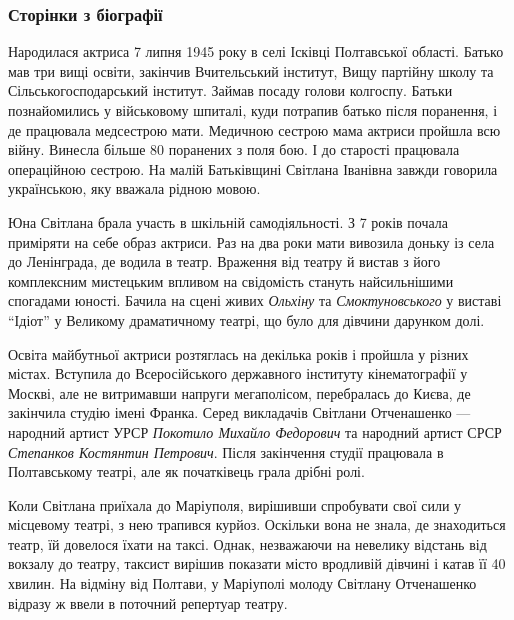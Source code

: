 \subsubsection{Сторінки з біографії}

Народилася актриса 7 липня 1945 року в селі Ісківці Полтавської області. Батько
мав три вищі освіти, закінчив Вчительський інститут, Вищу партійну школу та
Сільськогосподарський інститут. Займав посаду голови колгоспу. Батьки
познайомились у військовому шпиталі, куди потрапив батько після поранення, і де
працювала медсестрою мати. Медичною сестрою мама актриси пройшла всю війну.
Винесла більше 80 поранених з поля бою. І до старості працювала операційною
сестрою. На малій Батьківщині Світлана Іванівна завжди говорила українською,
яку вважала рідною мовою.


Юна Світлана брала участь в шкільній самодіяльності. З 7 років почала приміряти
на себе образ актриси. Раз на два роки мати вивозила доньку із села до
Ленінграда, де водила в театр. Враження від театру й вистав з його комплексним
мистецьким впливом на свідомість стануть найсильнішими спогадами юності. Бачила
на сцені живих \emph{Ольхіну} та \emph{Смоктуновського} у виставі \enquote{Ідіот} у Великому
драматичному театрі, що було для дівчини дарунком долі.

Освіта майбутньої актриси розтяглась на декілька років і пройшла у різних
містах. Вступила до Всеросійського державного інституту кінематографії у
Москві, але не витримавши напруги мегаполісом, перебралась до Києва, де
закінчила студію імені Франка. Серед викладачів Світлани Отченашенко — народний
артист УРСР \emph{Покотило Михайло Федорович} та народний артист СРСР \emph{Степанков
Костянтин Петрович}. Після закінчення студії працювала в Полтавському театрі,
але як початківець грала дрібні ролі.


Коли Світлана приїхала до Маріуполя, вирішивши спробувати свої сили у місцевому
театрі, з нею трапився курйоз. Оскільки вона не знала, де знаходиться театр, їй
довелося їхати на таксі. Однак, незважаючи на невелику відстань від вокзалу до
театру, таксист вирішив показати місто вродливій дівчині і катав її 40 хвилин.
На відміну від Полтави, у Маріуполі молоду Світлану Отченашенко відразу ж ввели
в поточний репертуар театру.

